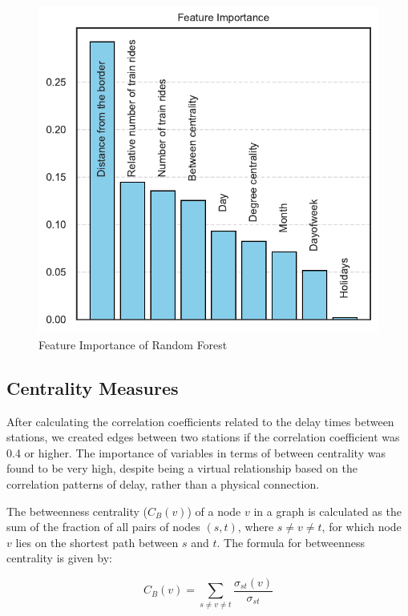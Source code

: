 \documentclass{article}
\theoremstyle{plain}
\theoremstyle{definition}
\theoremstyle{remark}
\begin{document}
\begin{figure}
    \centering
    \includegraphics[width=1\linewidth]{fig/plot_JH_feature_importance.pdf}
    \caption{Feature Importance of Random Forest}
    \label{fig:enter-label}
\end{figure}

\subsection{{Centrality Measures}}

After calculating the correlation coefficients related to the delay times between stations, we created edges between two stations if the correlation coefficient was 0.4 or higher. The importance of variables in terms of between centrality was found to be very high, despite being a virtual relationship based on the correlation patterns of delay, rather than a physical connection. 


The betweenness centrality ($C_B(v)$) of a node $v$ in a graph is calculated as the sum of the fraction of all pairs of nodes $(s, t)$, where $s \neq v \neq t$, for which node $v$ lies on the shortest path between $s$ and $t$. The formula for betweenness centrality is given by:

\begin{equation}
C_B(v) = \sum_{s \neq v \neq t} \frac{\sigma_{st}(v)}{\sigma_{st}}
\end{equation}
\end{document}
